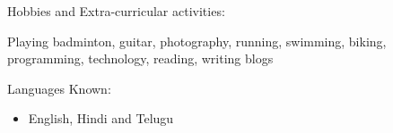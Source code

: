 \documentclass[10pt]{article}
\begin{document}
\begin{cv}
\begin{cvlist}{Hobbies and Extra-curricular activities:}
\begin{itemize}
Playing badminton, guitar,  photography,  running, swimming, biking, programming, technology, reading, writing blogs


	\end{itemize}

\end{cvlist}


\begin{cvlist}{Languages Known:}
\item
\begin{itemize}\itemsep=0.25em
	\item English, Hindi and Telugu
	\end{itemize}

\end{cvlist}




\setlength{\cvlabelwidth}{\oldcvlabelwidth}
\setlength{\cvlabelsep}{\oldcvlabelsep}

\end{cv}
\end{document}
